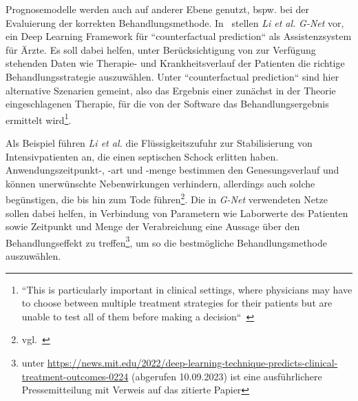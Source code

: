Prognosemodelle werden auch auf anderer Ebene genutzt, bspw. bei der Evaluierung der korrekten Behandlungsmethode. In~\cite{LHL+21} stellen \textit{Li et al.} \textit{G-Net} vor, ein Deep Learning Framework für ``counterfactual prediction`` als Assistenzsystem für Ärzte. Es soll dabei helfen, unter Berücksichtigung von zur Verfügung stehenden Daten wie Therapie- und Krankheitsverlauf der Patienten die richtige Behandlungsstrategie auszuwählen. Unter ``counterfactual prediction`` sind hier alternative Szenarien gemeint, also das Ergebnis einer zunächst in der Theorie eingeschlagenen Therapie, für die von der Software das
Behandlungsergebnis ermittelt wird\footnote{
    ``This is particularly important in clinical settings, where physicians may have to choose between multiple treatment strategies for their patients but are unable to test all of them before making a decision``~\cite[282]{LHL+21}
}.

Als Beispiel führen \textit{Li et al.} die Flüssigkeitszufuhr zur Stabilisierung von Intensivpatienten an, die einen septischen Schock erlitten haben. Anwendungszeitpunkt-, -art und -menge bestimmen den Genesungsverlauf und können unerwünschte Nebenwirkungen verhindern, allerdings auch solche begünstigen, die bis hin zum Tode führen\footnote{vgl.~\cite[5 f.]{SST+20}}. Die in \textit{G-Net} verwendeten Netze sollen dabei helfen, in Verbindung von Parametern wie Laborwerte des Patienten sowie Zeitpunkt und Menge der Verabreichung eine Aussage über den Behandlungseffekt zu treffen\footnote{
    unter \url{https://news.mit.edu/2022/deep-learning-technique-predicts-clinical-treatment-outcomes-0224} (abgerufen 10.09.2023) ist eine ausführlichere Pressemitteilung mit Verweis auf das zitierte Papier
}, um so die bestmögliche Behandlungsmethode auszuwählen.

